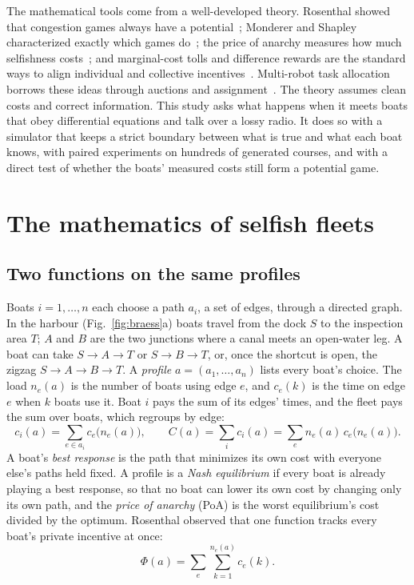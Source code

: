 \documentclass[11pt]{article}
\theoremstyle{definition}
\begin{document}
The mathematical tools come from a well-developed theory. Rosenthal showed that congestion games always have a potential~\cite{rosenthal1973}; Monderer and Shapley characterized exactly which games do~\cite{monderer1996}; the price of anarchy measures how much selfishness costs~\cite{roughgarden2002}; and marginal-cost tolls and difference rewards are the standard ways to align individual and collective incentives~\cite{wolpert2001,wolpert2002,marden2009}. Multi-robot task allocation borrows these ideas through auctions and assignment~\cite{gerkey2004,choi2009}. The theory assumes clean costs and correct information. This study asks what happens when it meets boats that obey differential equations and talk over a lossy radio. It does so with a simulator that keeps a strict boundary between what is true and what each boat knows, with paired experiments on hundreds of generated courses, and with a direct test of whether the boats' measured costs still form a potential game.

\section{The mathematics of selfish fleets}
\label{sec:math}

\subsection{Two functions on the same profiles}
Boats $i=1,\dots,n$ each choose a path $a_i$, a set of edges, through a directed graph. In the harbour (Fig.~\ref{fig:braess}a) boats travel from the dock $S$ to the inspection area $T$; $A$ and $B$ are the two junctions where a canal meets an open-water leg. A boat can take \mbox{$S\!\to\!A\!\to\!T$} or \mbox{$S\!\to\!B\!\to\!T$}, or, once the shortcut is open, the zigzag \mbox{$S\!\to\!A\!\to\!B\!\to\!T$}. A \emph{profile} $a=(a_1,\dots,a_n)$ lists every boat's choice. The load $n_e(a)$ is the number of boats using edge $e$, and $c_e(k)$ is the time on edge $e$ when $k$ boats use it. Boat $i$ pays the sum of its edges' times, and the fleet pays the sum over boats, which regroups by edge:
\begin{equation}
c_i(a)=\sum_{e\in a_i}c_e\big(n_e(a)\big),\qquad
C(a)=\sum_i c_i(a)=\sum_e n_e(a)\,c_e\big(n_e(a)\big). \label{eq:C}
\end{equation}
A boat's \emph{best response} is the path that minimizes its own cost with everyone else's paths held fixed. A profile is a \emph{Nash equilibrium} if every boat is already playing a best response, so that no boat can lower its own cost by changing only its own path, and the \emph{price of anarchy} (PoA) is the worst equilibrium's cost divided by the optimum. Rosenthal observed that one function tracks every boat's private incentive at once:
\begin{equation}
\Phi(a)=\sum_e\sum_{k=1}^{n_e(a)}c_e(k). \label{eq:Phi}
\end{equation}
\end{document}
